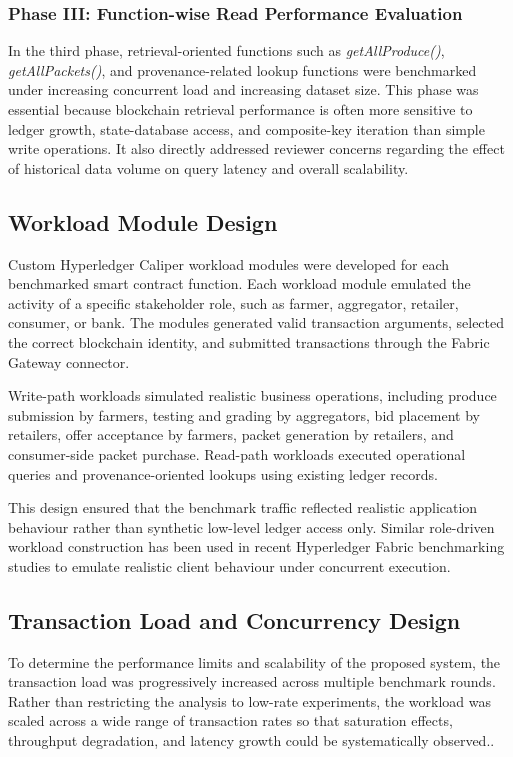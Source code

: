 \documentclass[12pt]{article}
\begin{document}
	\subsubsection{Phase III: Function-wise Read Performance Evaluation}
	
	In the third phase, retrieval-oriented functions such as \textit{getAllProduce()}, \textit{getAllPackets()}, and provenance-related lookup functions were benchmarked under increasing concurrent load and increasing dataset size. This phase was essential because blockchain retrieval performance is often more sensitive to ledger growth, state-database access, and composite-key iteration than simple write operations. It also directly addressed reviewer concerns regarding the effect of historical data volume on query latency and overall scalability.
	
	\subsection{Workload Module Design}
	
	Custom Hyperledger Caliper workload modules were developed for each benchmarked smart contract function. Each workload module emulated the activity of a specific stakeholder role, such as farmer, aggregator, retailer, consumer, or bank. The modules generated valid transaction arguments, selected the correct blockchain identity, and submitted transactions through the Fabric Gateway connector.
	
	Write-path workloads simulated realistic business operations, including produce submission by farmers, testing and grading by aggregators, bid placement by retailers, offer acceptance by farmers, packet generation by retailers, and consumer-side packet purchase. Read-path workloads executed operational queries and provenance-oriented lookups using existing ledger records.
	
	This design ensured that the benchmark traffic reflected realistic application behaviour rather than synthetic low-level ledger access only. Similar role-driven workload construction has been used in recent Hyperledger Fabric benchmarking studies to emulate realistic client behaviour under concurrent execution. 
	
	\subsection{Transaction Load and Concurrency Design}
	
To determine the performance limits and scalability of the proposed system, the transaction load was progressively increased across multiple benchmark rounds. Rather than restricting the analysis to low-rate experiments, the workload was scaled across a wide range of transaction rates so that saturation effects, throughput degradation, and latency growth could be systematically observed..
	
\end{document}
